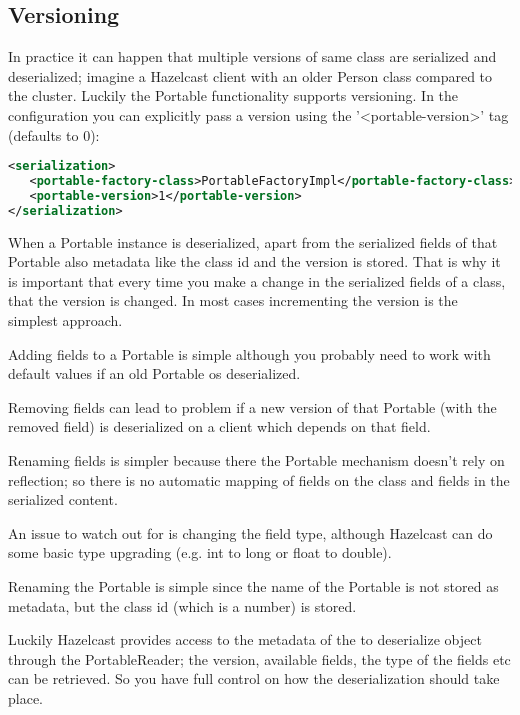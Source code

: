 \subsection*{Versioning}
In practice it can happen that multiple versions of same class are serialized and deserialized; imagine a Hazelcast client with an older Person class compared to the cluster. Luckily the Portable functionality supports versioning. In the configuration you can explicitly pass a version using the '<portable-version>' tag (defaults to 0):
\begin{lstlisting}[language=xml]
<serialization>
   <portable-factory-class>PortableFactoryImpl</portable-factory-class>
   <portable-version>1</portable-version>
</serialization>
\end{lstlisting}
When a Portable instance is deserialized, apart from the serialized fields of that Portable also metadata like the class id and the version is stored. That is why it is important that every time you make a change in the serialized fields of a class, that the version is changed. In most cases incrementing the version is the simplest approach.

Adding fields to a Portable is simple although you probably need to work with default values if an old Portable os deserialized. 

Removing fields can lead to problem if a new version of that Portable (with the removed field) is deserialized on a client which depends on that field. 

Renaming fields is simpler because there the Portable mechanism doesn't rely on reflection; so there is no automatic mapping of fields on the class and fields in the serialized content.

An issue to watch out for is changing the field type, although Hazelcast can do some basic type upgrading (e.g. int to long or float to double). 

Renaming the Portable is simple since the name of the Portable is not stored as metadata, but the class id (which is a number) is stored.

Luckily Hazelcast provides access to the metadata of the to deserialize object through the PortableReader; the  version, available fields, the type of the fields etc can be retrieved. So you have full control on how the deserialization should take place. 

